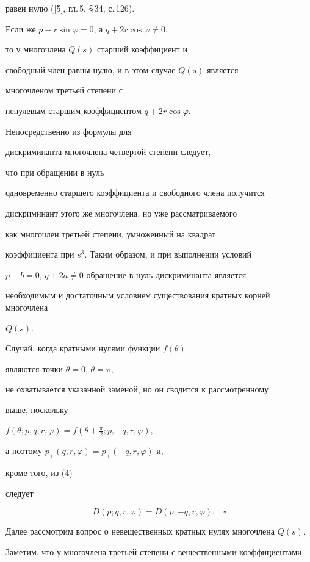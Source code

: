 равен нулю ([5], гл.\,5, \S\,34, с.\,126).


Если же $p - r\sin \varphi=0$, а $q+2r\cos \varphi \ne 0$,


то у многочлена $Q(s)$ старший коэффициент и


свободный член равны нулю, и в этом случае $Q(s)$ является


многочленом третьей степени с


ненулевым старшим коэффициентом $q+2r\cos \varphi. $


Непосредственно из формулы для


дискриминанта многочлена четвертой степени следует,


что при обращении в нуль


одновременно старшего коэффициента и свободного члена получится


дискриминант этого же многочлена, но уже рассматриваемого


как многочлен третьей степени, умноженный на квадрат


коэффициента при $s^3$. Таким образом, и при выполнении условий


$p - b=0$, $q+2a \ne 0$ обращение в нуль дискриминанта является


необходимым и достаточным условием существования кратных корней многочлена


$Q(s)$.





Случай, когда кратными нулями функции $f(\theta)$


являются точки $\theta=0$, $\theta=\pi$,


не охватывается указанной заменой, но он сводится к рассмотренному


выше, поскольку


$f(\theta ;p,q,r,\varphi)=f(\theta+\frac {\pi}{2} ;p,-q,r,\varphi)$,


а поэтому $p_\pm (q,r,\varphi)=p_\pm (-q,r,\varphi)$ и,


кроме того, из (4)


следует


$$


D(p;q,r,\varphi)=D(p;-q,r,\varphi).\quad\square


$$





Далее рассмотрим вопрос о невещественных кратных нулях многочлена $Q(s)$.


Заметим, что у многочлена третьей степени с вещественными коэффициентами


